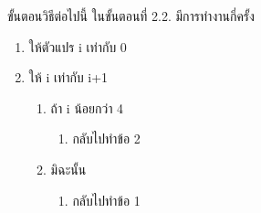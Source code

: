 ﻿%
\question ขั้นตอนวิธีต่อไปนี้ ในขั้นตอนที่ 2.2. มีการทำงานกี่ครั้ง 
\begin{pseudocode}
\begin{enumerate}
    \item ให้ตัวแปร i เท่ากับ 0 
    \item ให้ i เท่ากับ i+1 
    \begin{enumerate}
        \item ถ้า i น้อยกว่า 4
        \begin{enumerate}
            \item กลับไปทำข้อ 2 
        \end{enumerate}
        \item มิฉะนั้น
        \begin{enumerate}
            \item กลับไปทำข้อ 1
        \end{enumerate}
    \end{enumerate}
\end{enumerate}
\end{pseudocode}
